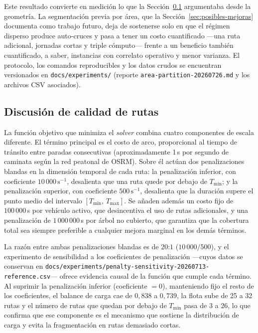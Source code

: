 Este resultado convierte en medición lo que la Sección~\ref{sec:discusion-calidad}
argumentaba desde la geometría. La segmentación previa por área, que la
Sección~\ref{sec:posibles-mejoras} documenta como trabajo futuro, deja de
sostenerse solo en que el régimen disperso produce auto-cruces y pasa a tener un
costo cuantificado ---una ruta adicional, jornadas cortas y triple cómputo---
frente a un beneficio también cuantificado, a saber, instancias con correlato
operativo y menor varianza. El protocolo, los comandos reproducibles y los datos
crudos se encuentran versionados en \texttt{docs/experiments/} (reporte
\texttt{area-partition-20260726.md} y los archivos CSV asociados).

\subsection{Discusión de calidad de rutas}
\label{sec:discusion-calidad}

La función objetivo que minimiza el \textit{solver} combina cuatro componentes
de escala diferente. El término principal es el costo de arco, proporcional al tiempo
de tránsito entre paradas consecutivas (aproximadamente 1\,s por segundo de caminata
según la red peatonal de OSRM). Sobre él actúan dos penalizaciones blandas en la
dimensión temporal de cada ruta: la penalización inferior, con coeficiente
$10\,000\,\text{s}^{-1}$, desalienta que una ruta quede por debajo de $T_{\min}$;
y la penalización superior, con coeficiente $500\,\text{s}^{-1}$, desalienta que la
duración supere el punto medio del intervalo $[T_{\min},\,T_{\max}]$. Se añaden
además un costo fijo de $100\,000$\,s por vehículo activo, que desincentiva el uso
de rutas adicionales, y una penalización de $1\,000\,000$\,s por árbol no cubierto,
que garantiza que la cobertura total sea siempre preferible a cualquier mejora marginal
en los demás términos.

La razón entre ambas penalizaciones blandas es de $20\mathord{:}1$ ($10\,000 / 500$),
y el experimento de sensibilidad a los coeficientes de penalización ---cuyos datos se
conservan en \texttt{docs/experiments/penalty-sensitivity-20260713-reference.csv}---
ofrece evidencia causal de la función que cumple cada término. Al suprimir la
penalización inferior (coeficiente $= 0$), manteniendo fijo el resto de los
coeficientes, el balance de carga cae de $0{,}838$ a $0{,}739$, la flota sube de
25 a 32 rutas y el número de rutas que quedan por debajo de $T_{\min}$ pasa de 3
a 26, lo que confirma que ese componente es el mecanismo que sostiene la
distribución de carga y evita la fragmentación en rutas demasiado cortas.

